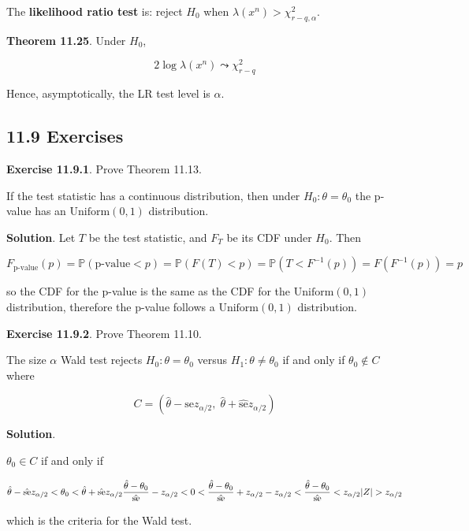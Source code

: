 The \textbf{likelihood ratio test} is: reject \(H_{0}\) when
\(\lambda(x^{n}) > \chi^{2}_{r-q, \alpha}\).

\textbf{Theorem 11.25}. Under \(H_{0}\),

\[ 2 \log \lambda (x^{n}) \leadsto \chi^{2}_{r - q}\]

Hence, asymptotically, the LR test level is \(\alpha\).

\subsection*{11.9 Exercises}

\textbf{Exercise 11.9.1}. Prove Theorem 11.13.

If the test statistic has a continuous distribution, then under
\(H_{0}: \theta = \theta_{0}\) the p-value has an \(\text{Uniform}(0, 1)\)
distribution.

\textbf{Solution}. Let \(T\) be the test statistic, and \(F_T\) be its
CDF under \(H_{0}\). Then

\[ F_\text{p-value}(p) = \mathbb{P}(\text{p-value} < p) = \mathbb{P}(F(T) < p) = \mathbb{P}(T < F^{-1}(p)) = F(F^{-1}(p)) = p\]

so the CDF for the p-value is the same as the CDF for the
\(\text{Uniform}(0, 1)\) distribution, therefore the p-value follows a
\(\text{Uniform}(0, 1)\) distribution.

\textbf{Exercise 11.9.2}. Prove Theorem 11.10.

The size \(\alpha\) Wald test rejects \(H_{0}: \theta = \theta_{0}\) versus
\(H_{1}: \theta \neq \theta_{0}\) if and only if \(\theta_{0} \notin C\) where

\[ C = \left(\hat{\theta} - \hat{\text{se}} z_{\alpha/2}, \; \hat{\theta} + \hat{\text{se}} z_{\alpha / 2} \right) \]

\textbf{Solution}.

\(\theta_{0} \in C\) if and only if

\[
\hat{\theta} - \hat{\text{se}} z_{\alpha/2} < \theta_{0} < \hat{\theta} + \hat{\text{se}} z_{\alpha/2} \\
\frac{\hat{\theta} - \theta_{0}}{\hat{\text{se}}} - z_{\alpha/2} < 0 < \frac{\hat{\theta} - \theta_{0}}{\hat{\text{se}}} +  z_{\alpha/2} \\
- z_{\alpha/2} < \frac{\hat{\theta} - \theta_{0}}{\hat{\text{se}}} < z_{\alpha/2} \\
|Z| > z_{\alpha/2}
\]

which is the criteria for the Wald test.

